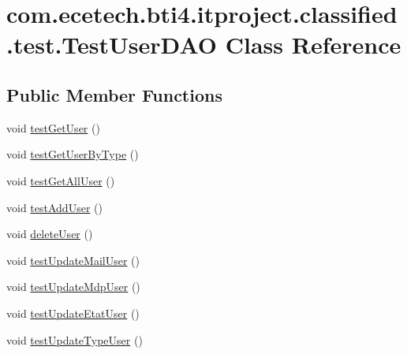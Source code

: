 \hypertarget{classcom_1_1ecetech_1_1bti4_1_1itproject_1_1classified_1_1test_1_1_test_user_d_a_o}{}\section{com.\+ecetech.\+bti4.\+itproject.\+classified.\+test.\+Test\+User\+D\+AO Class Reference}
\label{classcom_1_1ecetech_1_1bti4_1_1itproject_1_1classified_1_1test_1_1_test_user_d_a_o}
\subsection*{Public Member Functions}
\begin{DoxyCompactItemize}
\item 
void \hyperlink{classcom_1_1ecetech_1_1bti4_1_1itproject_1_1classified_1_1test_1_1_test_user_d_a_o_a258cdef33b222bc6e798f03d0450376f}{test\+Get\+User} ()
\item 
void \hyperlink{classcom_1_1ecetech_1_1bti4_1_1itproject_1_1classified_1_1test_1_1_test_user_d_a_o_a50296b17dd52ba6f3c30d39b7c38eea4}{test\+Get\+User\+By\+Type} ()
\item 
void \hyperlink{classcom_1_1ecetech_1_1bti4_1_1itproject_1_1classified_1_1test_1_1_test_user_d_a_o_a1a72ae9959790bace614d33d612f0e0b}{test\+Get\+All\+User} ()
\item 
void \hyperlink{classcom_1_1ecetech_1_1bti4_1_1itproject_1_1classified_1_1test_1_1_test_user_d_a_o_a53bbf153b7a47d3867298f87c5bb048a}{test\+Add\+User} ()
\item 
void \hyperlink{classcom_1_1ecetech_1_1bti4_1_1itproject_1_1classified_1_1test_1_1_test_user_d_a_o_ab71534b2d52a0b87b5ae3ff566f71875}{delete\+User} ()
\item 
void \hyperlink{classcom_1_1ecetech_1_1bti4_1_1itproject_1_1classified_1_1test_1_1_test_user_d_a_o_a96eed01b43ab13624e37aedf11f211c1}{test\+Update\+Mail\+User} ()
\item 
void \hyperlink{classcom_1_1ecetech_1_1bti4_1_1itproject_1_1classified_1_1test_1_1_test_user_d_a_o_a971bef441ed237b870022340a509c31e}{test\+Update\+Mdp\+User} ()
\item 
void \hyperlink{classcom_1_1ecetech_1_1bti4_1_1itproject_1_1classified_1_1test_1_1_test_user_d_a_o_a61c42dd93d162585be37ab8bb67c2ecd}{test\+Update\+Etat\+User} ()
\item 
void \hyperlink{classcom_1_1ecetech_1_1bti4_1_1itproject_1_1classified_1_1test_1_1_test_user_d_a_o_a8a3c25fe44e21c6fc3ed1885c9ba664a}{test\+Update\+Type\+User} ()

\end{DoxyCompactItemize}
